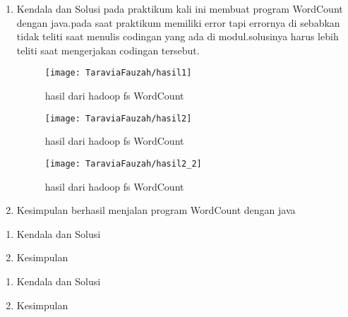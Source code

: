 \begin{enumerate}
\item Kendala dan Solusi
\newline pada praktikum kali ini membuat program WordCount dengan java.pada saat praktikum memiliki error tapi errornya di sebabkan tidak teliti saat menulis codingan yang ada di modul.solusinya harus lebih teliti saat mengerjakan codingan tersebut.

\begin{figure}[!ht]
\texttt{[image: TaraviaFauzah/hasil1]}
\caption{hasil dari hadoop fs WordCount}
\label{gam:perkuliahan2-12}
\end{figure}

\begin{figure}[!ht]
\texttt{[image: TaraviaFauzah/hasil2]}
\caption{hasil dari hadoop fs WordCount}
\label{gam:perkuliahan2-12}
\end{figure}

\begin{figure}[!ht]
\texttt{[image: TaraviaFauzah/hasil2\_2]}
\caption{hasil dari hadoop fs WordCount}
\label{gam:perkuliahan2-12}
\end{figure}

\item Kesimpulan
\newline berhasil menjalan program WordCount dengan java

\end{enumerate}

\begin{enumerate}
\item Kendala dan Solusi

\item Kesimpulan

\end{enumerate}
\begin{enumerate}
\item Kendala dan Solusi

\item Kesimpulan

\end{enumerate}